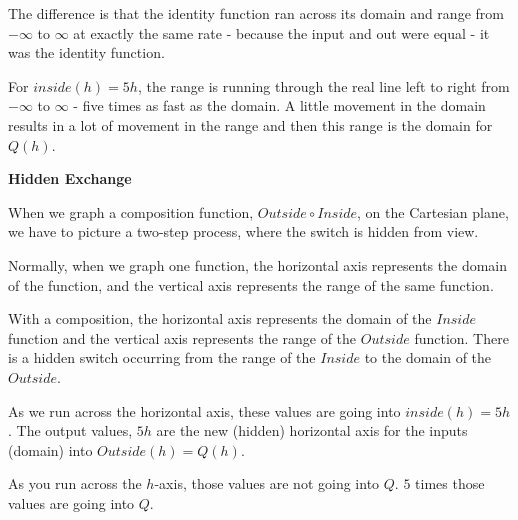 \documentclass{ximera}
\begin{document}
The difference is that the identity function ran across its domain and range from $-\infty$ to $\infty$ at exactly the same rate - because the input and out were equal - it was the identity function.


For $inside(h) = 5h$, the range is running through the real line left to right from $-\infty$ to $\infty$ - five times as fast as the domain. A little movement in the domain results in a lot of movement in the range and then this range is the domain for $Q(h)$.






\begin{observation} \textbf{\textcolor{-red!75}{Hidden Exchange}}

When we graph a composition function, $Outside \circ Inside$, on the Cartesian plane, we have to picture a two-step process, where the switch is hidden from view.  

Normally, when we graph one function, the horizontal axis represents the domain of the function, and the vertical axis represents the range of the same function.

With a composition, the horizontal axis represents the domain of the $Inside$ function and the vertical axis represents the range of the $Outside$ function.  There is a hidden switch occurring from the range of the $Inside$ to the domain of the $Outside$.

\end{observation}

As we run across the horizontal axis, these values are going into $inside(h) = 5h$.  The output values, $5h$ are the new (hidden) horizontal axis for the inputs (domain) into $Outside(h) = Q(h)$.

As you run across the $h$-axis, those values are not going into $Q$.  $5$ times those values are going into $Q$.
\end{document}
